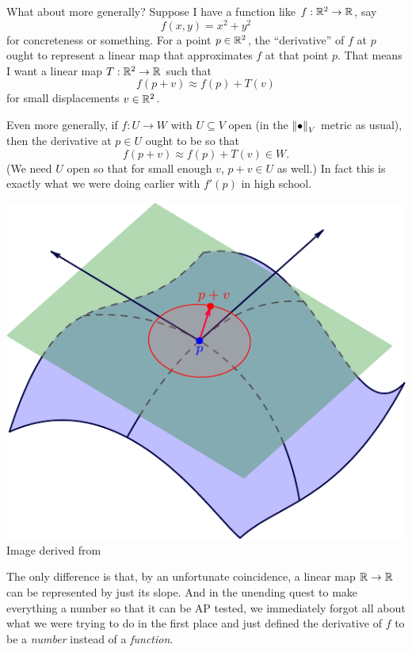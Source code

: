 What about more generally?
Suppose I have a function like $f : \mathbb R^2 \to \mathbb R$, say 
\[ f(x,y) = x^2+y^2 \]
for concreteness or something.
For a point $p \in \mathbb R^2$, the ``derivative'' of $f$ at $p$ ought to represent a linear map
that approximates $f$ at that point $p$.
That means I want a linear map $T : \mathbb R^2 \to \mathbb R$ such that
\[ f(p + v) \approx f(p) + T(v) \]
for small displacements $v \in \mathbb R^2$.

Even more generally, if $f : U \to W$ with $U \subseteq V$ open
(in the $\left\lVert \bullet \right\rVert_V$ metric as usual),
then the derivative at $p \in U$ ought to be so that
\[ f(p + v) \approx f(p) + T(v) \in W. \]
(We need $U$ open so that for small enough $v$, $p+v \in U$ as well.)
In fact this is exactly what we were doing earlier with $f'(p)$ in high school.

\begin{center}
	\includegraphics{media/tangent.pdf}
	\\ \scriptsize Image derived from \cite{img:tangentplane}
\end{center}

The only difference is that, by an unfortunate coincidence,
a linear map $\mathbb R \to \mathbb R$ can be represented by just its slope.
And in the unending quest to make everything a number so that it can be AP tested,
we immediately forgot all about what we were trying to do in the first place
and just defined the derivative of $f$ to be a \emph{number} instead of a \emph{function}.

